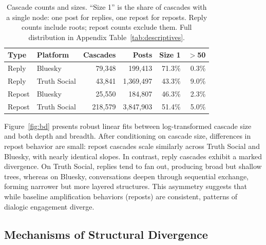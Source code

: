 \documentclass[letterpaper]{article} %
\newcommand{\rev}[1]{{\color{blue}#1}}
\begin{document}
\begin{table}[t]
\centering
\footnotesize
\setlength{\tabcolsep}{3pt}
\rev{
\begin{tabular}{llrrrr}
\toprule
Type & Platform & Cascades & Posts & Size 1 & $>$50 \\
\midrule
Reply & Bluesky & 79{,}348 & 199{,}413 & 71.3\% & 0.3\% \\
Reply & Truth Social & 43{,}841 & 1{,}369{,}497 & 43.3\% & 9.0\% \\
Repost & Bluesky & 25{,}550 & 184{,}807 & 46.3\% & 2.3\% \\
Repost & Truth Social & 218{,}579 & 3{,}847{,}903 & 51.4\% & 5.0\% \\
\bottomrule
\end{tabular}
}
\caption{\rev{Cascade counts and sizes. ``Size 1'' is the share of cascades with a single node: one post for replies, one repost for reposts. Reply counts include roots; repost counts exclude them. Full distribution in Appendix Table~\ref{tab:descriptives}.}}
\label{tab:descriptives_main}
\end{table}

Figure~\ref{fig:bd} presents robust linear fits between log-transformed cascade size and both depth and breadth. After conditioning on cascade size, differences in repost behavior are small: repost cascades scale similarly across Truth Social and Bluesky, with nearly identical slopes. In contrast, reply cascades exhibit a marked divergence. On Truth Social, replies tend to fan out, producing broad but shallow trees, whereas on Bluesky, conversations deepen through sequential exchange, forming narrower but more layered structures. This asymmetry suggests that while baseline amplification behaviors (reposts) are consistent, patterns of dialogic engagement diverge.

\subsection{Mechanisms of Structural Divergence}
\end{document}
